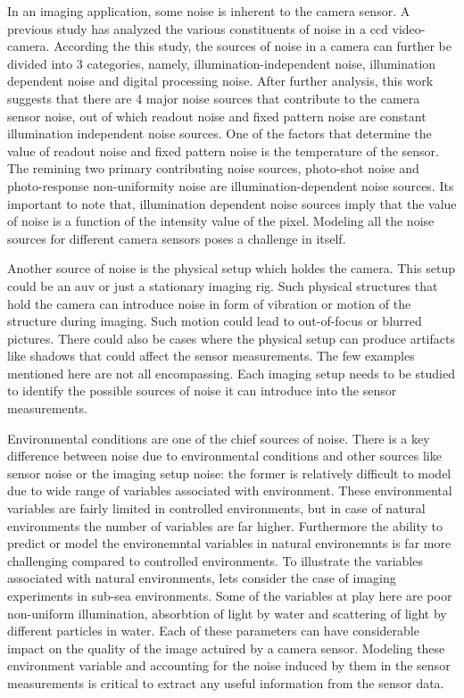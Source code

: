 \documentclass {udthesis}
\begin{document}
In an imaging application, some noise is inherent to the camera sensor. A previous study \cite{irie} has analyzed the various constituents of noise 
in a \gls{ccd} video-camera. According the this study, the sources of noise in a camera can further be divided into 3 categories, namely, illumination-independent noise, illumination dependent noise and digital processing noise. After further analysis, this work suggests that there are 4 major noise sources that contribute to the camera sensor noise, out of which readout noise and fixed pattern noise are constant illumination independent noise sources. One of the factors that determine the value of readout noise and fixed pattern noise is the temperature of the sensor. The remining two primary contributing noise sources, photo-shot noise and photo-response non-uniformity noise are illumination-dependent noise sources. Its important to note that, illumination dependent noise sources imply that the value of noise is a function of the intensity value of the pixel. Modeling all the noise sources for different camera sensors poses a challenge in itself.

Another source of noise is the physical setup which holdes the camera. This setup could be an \gls{auv} or just a stationary imaging rig. Such physical structures that hold the camera can introduce noise in form of vibration or motion of the structure during imaging. Such motion could lead to out-of-focus or blurred pictures. There could also be cases where the physical setup can produce artifacts like shadows that could affect the sensor measurements. The few examples mentioned here are not all encompassing. Each imaging setup needs to be studied to identify the possible sources of noise it can introduce into the sensor measurements.

Environmental conditions are one of the chief sources of noise. There is a key difference between noise due to environmental conditions 
and other sources like sensor noise or the imaging setup noise: the former is relatively difficult to model due to wide range of variables
associated with environment. These environmental variables are fairly limited in controlled environments, but in case of natural environments
the number of variables are far higher. Furthermore the ability to predict or model the environemntal variables in natural
environemnts is far more challenging compared to controlled environments. To illustrate the variables associated with natural environments, lets
consider the case of imaging experiments in sub-sea environments. 
Some of the variables at play here are poor non-uniform illumination, absorbtion of light by water
and scattering of light by different particles in water. Each of these parameters can have considerable impact on the quality of the image actuired by
a camera sensor. Modeling these environment variable and accounting for the noise induced by them in the sensor measurements is critical to extract any useful
information from the sensor data.
\end{document}
